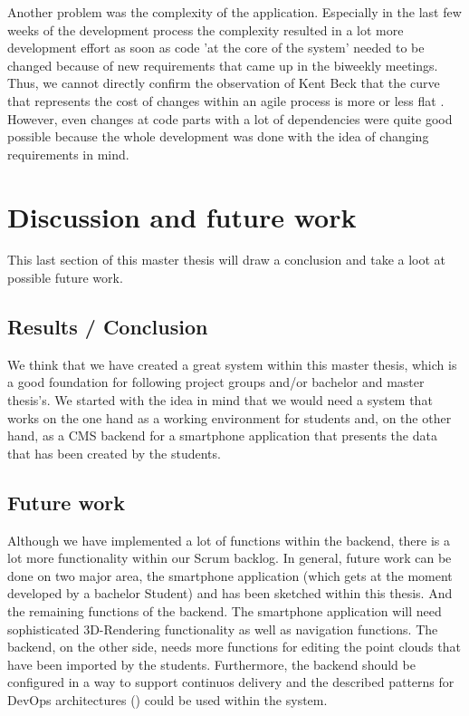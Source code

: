 Another problem was the complexity of the application. Especially in the last few weeks of the development process the complexity resulted in a lot more development effort as soon as code 'at the core of the system' needed to be changed because of new requirements that came up in the biweekly meetings. Thus, we cannot directly confirm the observation of Kent Beck that the curve that represents the cost of changes within an agile process is more or less flat \cite{beck2003test}. However, even changes at code parts with a lot of dependencies were quite good possible because the whole development was done with the idea of changing requirements in mind. 

\section{Discussion and future work}
This last section of this master thesis will draw a conclusion and take a loot at possible future work.

\subsection{Results / Conclusion}
We think that we have created a great system within this master thesis, which is a good foundation for following project groups and/or bachelor and master thesis's. We started with the idea in mind that we would need a system that works on the one hand as a working environment for students and, on the other hand, as a \ac{CMS} backend for a smartphone application that presents the data that has been created by the students. 

\subsection{Future work}
Although we have implemented a lot of functions within the backend, there is a lot more functionality within our Scrum backlog. In general, future work can be done on two major area, the smartphone application (which gets at the moment developed by a bachelor Student) and has been sketched within this thesis. And the remaining functions of the backend. The smartphone application will need sophisticated 3D-Rendering functionality as well as navigation functions. The backend, on the other side, needs more functions for editing the point clouds that have been imported by the students. Furthermore, the backend should be configured in a way to support continuos delivery and the described patterns for DevOps architectures (\cite{cukier2013devops}) could be used within the system.  
